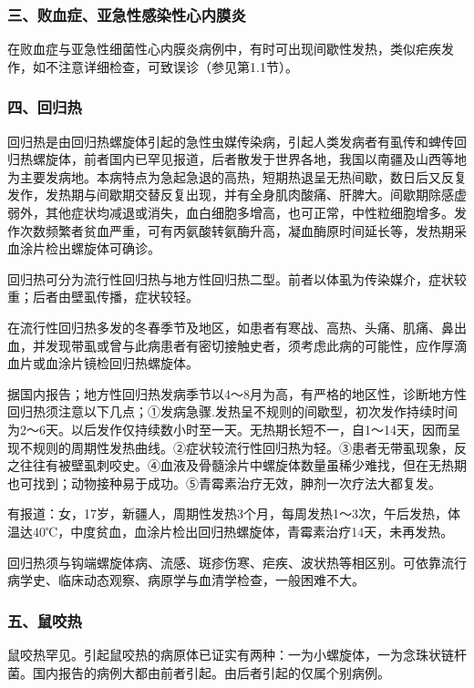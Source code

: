 \subsubsection{三、败血症、亚急性感染性心内膜炎}

在败血症与亚急性细菌性心内膜炎病例中，有时可出现间歇性发热，类似疟疾发作，如不注意详细检查，可致误诊（参见第1.1节）。

\subsubsection{四、回归热}

回归热是由回归热螺旋体引起的急性虫媒传染病，引起人类发病者有虱传和蜱传回归热螺旋体，前者国内已罕见报道，后者散发于世界各地，我国以南疆及山西等地为主要发病地。本病特点为急起急退的高热，短期热退呈无热间歇，数日后又反复发作，发热期与间歇期交替反复出现，并有全身肌肉酸痛、肝脾大。间歇期除感虚弱外，其他症状均减退或消失，血白细胞多增高，也可正常，中性粒细胞增多。发作次数频繁者贫血严重，可有丙氨酸转氨酶升高，凝血酶原时间延长等，发热期采血涂片检出螺旋体可确诊。

回归热可分为流行性回归热与地方性回归热二型。前者以体虱为传染媒介，症状较重；后者由壁虱传播，症状较轻。

在流行性回归热多发的冬春季节及地区，如患者有寒战、高热、头痛、肌痛、鼻出血，并发现带虱或曾与此病患者有密切接触史者，须考虑此病的可能性，应作厚滴血片或血涂片镜检回归热螺旋体。

据国内报告；地方性回归热发病季节以4～8月为高，有严格的地区性，诊断地方性回归热须注意以下几点；①发病急骤.发热呈不规则的间歇型，初次发作持续时间为2～6天。以后发作仅持续数小时至一天。无热期长短不一，自1～14天，因而呈现不规则的周期性发热曲线。②症状较流行性回归热为轻。③患者无带虱现象，反之往往有被壁虱刺咬史。④血液及骨髓涂片中螺旋体数量虽稀少难找，但在无热期也可找到；动物接种易于成功。⑤青霉素治疗无效，胂剂一次疗法大都复发。

有报道：女，17岁，新疆人，周期性发热3个月，每周发热1～3次，午后发热，体温达40℃，中度贫血，血涂片检出回归热螺旋体，青霉素治疗14天，未再发热。

回归热须与钩端螺旋体病、流感、斑疹伤寒、疟疾、波状热等相区别。可依靠流行病学史、临床动态观察、病原学与血清学检查，一般困难不大。

\subsubsection{五、鼠咬热}

鼠咬热罕见。引起鼠咬热的病原体已证实有两种：一为小螺旋体，一为念珠状链杆菌。国内报告的病例大都由前者引起。由后者引起的仅属个别病例。

